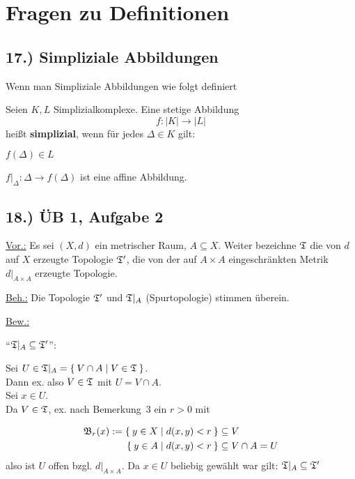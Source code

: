 \documentclass[a5paper,oneside]{scrbook}
\begin{document}
\chapter{Fragen zu Definitionen}

\section*{17.) Simpliziale Abbildungen}
Wenn man Simpliziale Abbildungen wie folgt definiert

\begin{definition}%
    Seien $K, L$ Simplizialkomplexe. Eine stetige Abbildung
    \[f:|K| \rightarrow |L|\]
    heißt \textbf{simplizial}, wenn für
    jedes $\Delta \in K$ gilt:
    \begin{defenum}
        \item $f(\Delta) \in L$
        \item $f|_{\Delta} : \Delta \rightarrow f(\Delta)$ ist eine
              affine Abbildung.
    \end{defenum}
\end{definition}


\section*{18.) ÜB 1, Aufgabe 2}
\underline{Vor.:} Es sei $(X, d)$ ein metrischer Raum, $A \subseteq X$.
Weiter bezeichne $\mathfrak{T}$ die von $d$ auf $X$ erzeugte Topologie $\mathfrak{T}'$, die von
der auf $A \times A$ eingeschränkten Metrik $d|_{A \times A}$ erzeugte Topologie.

\underline{Beh.:} Die Topologie $\mathfrak{T}'$ und $\mathfrak{T}|_A$ (Spurtopologie) stimmen überein.

\underline{Bew.:}

\enquote{$\mathfrak{T}|_A \subseteq \mathfrak{T}'$}:

Sei $U \in \mathfrak{T}|_A = \Set{V \cap A | V \in \mathfrak{T}}$.\\
Dann ex. also $V \in \mathfrak{T}$ mit
$U = V \cap A$.\\
Sei $x \in U$.\\
Da $V \in \mathfrak{T}$, ex. nach Bemerkung~3 ein $r > 0$ mit

\begin{align*}
    \mathfrak{B}_r(x) := \Set{y \in X | d(x,y) < r} &\subseteq V\\
                \Set{y \in A | d(x,y) < r} &\subseteq V \cap A = U
\end{align*}
also ist $U$ offen bzgl. $d|_{A \times A}$.
Da $x \in U$ beliebig gewählt war gilt: $\mathfrak{T}|_A \subseteq \mathfrak{T}'$
\end{document}
